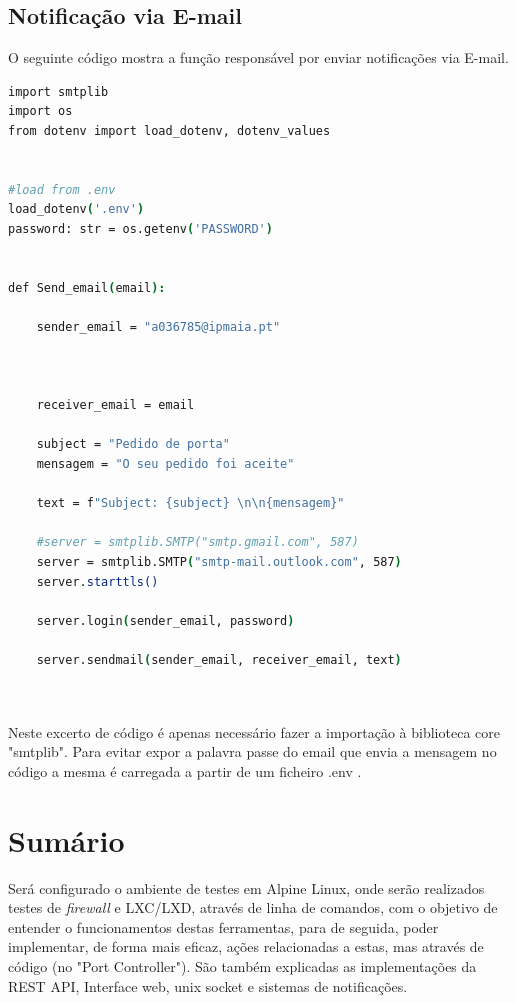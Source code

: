 \subsection{Notificação via E-mail}

O seguinte código mostra a função responsável por enviar notificações via E-mail.

\begin{lstlisting}[language=csh, caption={Teste de notificação via Microsoft Teams}]
import smtplib
import os
from dotenv import load_dotenv, dotenv_values


#load from .env
load_dotenv('.env')
password: str = os.getenv('PASSWORD')


def Send_email(email):
    
    sender_email = "a036785@ipmaia.pt"

    
    
    receiver_email = email
    
    subject = "Pedido de porta"
    mensagem = "O seu pedido foi aceite"
    
    text = f"Subject: {subject} \n\n{mensagem}"
    
    #server = smtplib.SMTP("smtp.gmail.com", 587)
    server = smtplib.SMTP("smtp-mail.outlook.com", 587)
    server.starttls()
    
    server.login(sender_email, password)
    
    server.sendmail(sender_email, receiver_email, text)
    
        
\end{lstlisting}

Neste excerto de código é apenas necessário fazer a importação à biblioteca core
"smtplib". 
Para evitar expor a palavra passe do email que envia a mensagem no código a mesma 
é carregada a partir de um ficheiro .env .





\section*{Sumário}

Será configurado o ambiente de testes em Alpine Linux, onde serão realizados testes
de \textit{firewall} e LXC/LXD, através de linha de comandos, com o objetivo de entender 
o funcionamentos destas ferramentas, para de seguida, poder implementar, de forma mais eficaz,
ações relacionadas a estas, mas através de código (no "Port Controller"). São também 
explicadas as implementações da REST API, Interface web, unix socket e sistemas de notificações.







